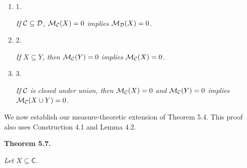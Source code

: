 \begin{enumerate}


\item[] 
1. 


\emph{If }${\cal C}\subseteq{\cal D}$\emph{, }${{\cal M}_{{\cal C}}}(X)=0$\emph{ implies }${{\cal M}_{{\cal D}}}(X)=0$\emph{.}\par





\item[] 
2. 


\emph{If }$X\subseteq Y$\emph{, then }${{\cal M}_{{\cal C}}}(Y)=0$\emph{ implies }${{\cal M}_{{\cal C}}}(X)=0$\emph{.}\par





\item[] 
3. 


\emph{If }${\cal C}$\emph{ is closed under union, then }${{\cal M}_{{\cal C}}}(X)=0$\emph{ and }${{\cal M}_{{\cal C}}}(Y)=0$\emph{ implies }${{\cal M}_{{\cal C}}}(X\cup Y)=0$\emph{.}\par





\end{enumerate}






We now establish our measure-theoretic extension of Theorem 5.4. This proof also uses Construction 4.1 and Lemma 4.2.\par





\par\medskip\noindent\textbf{
\textbf{Theorem 5.7}\textbf{.}
}\par



\emph{Let $X\subseteq\mathsf{C}$.}\par


